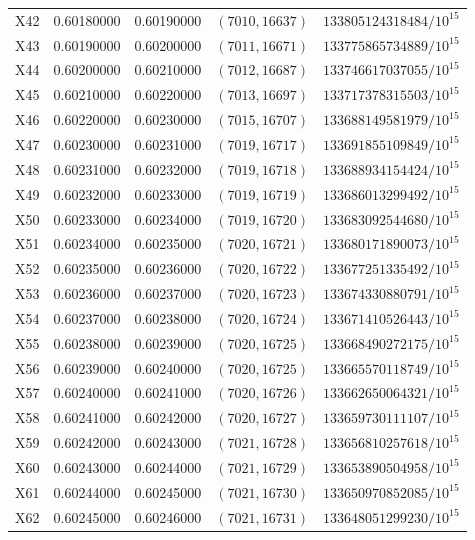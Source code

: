 \documentclass[11pt]{article}
\theoremstyle{remark}\newtheorem{remark}[theorem]{Remark}
\begin{document}
\begin{longtable}{@{}lrrrl@{}}
X42 & 0.60180000 & 0.60190000 & $(7010,16637)$ & $133805124318484/10^{15}$\\
X43 & 0.60190000 & 0.60200000 & $(7011,16671)$ & $133775865734889/10^{15}$\\
X44 & 0.60200000 & 0.60210000 & $(7012,16687)$ & $133746617037055/10^{15}$\\
X45 & 0.60210000 & 0.60220000 & $(7013,16697)$ & $133717378315503/10^{15}$\\
X46 & 0.60220000 & 0.60230000 & $(7015,16707)$ & $133688149581979/10^{15}$\\
X47 & 0.60230000 & 0.60231000 & $(7019,16717)$ & $133691855109849/10^{15}$\\
X48 & 0.60231000 & 0.60232000 & $(7019,16718)$ & $133688934154424/10^{15}$\\
X49 & 0.60232000 & 0.60233000 & $(7019,16719)$ & $133686013299492/10^{15}$\\
X50 & 0.60233000 & 0.60234000 & $(7019,16720)$ & $133683092544680/10^{15}$\\
X51 & 0.60234000 & 0.60235000 & $(7020,16721)$ & $133680171890073/10^{15}$\\
X52 & 0.60235000 & 0.60236000 & $(7020,16722)$ & $133677251335492/10^{15}$\\
X53 & 0.60236000 & 0.60237000 & $(7020,16723)$ & $133674330880791/10^{15}$\\
X54 & 0.60237000 & 0.60238000 & $(7020,16724)$ & $133671410526443/10^{15}$\\
X55 & 0.60238000 & 0.60239000 & $(7020,16725)$ & $133668490272175/10^{15}$\\
X56 & 0.60239000 & 0.60240000 & $(7020,16725)$ & $133665570118749/10^{15}$\\
X57 & 0.60240000 & 0.60241000 & $(7020,16726)$ & $133662650064321/10^{15}$\\
X58 & 0.60241000 & 0.60242000 & $(7020,16727)$ & $133659730111107/10^{15}$\\
X59 & 0.60242000 & 0.60243000 & $(7021,16728)$ & $133656810257618/10^{15}$\\
X60 & 0.60243000 & 0.60244000 & $(7021,16729)$ & $133653890504958/10^{15}$\\
X61 & 0.60244000 & 0.60245000 & $(7021,16730)$ & $133650970852085/10^{15}$\\
X62 & 0.60245000 & 0.60246000 & $(7021,16731)$ & $133648051299230/10^{15}$\\
\bottomrule
\end{longtable}
\end{document}
